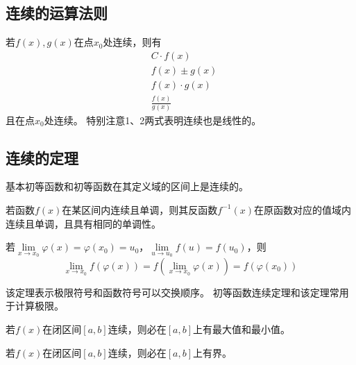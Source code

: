 \subsection{连续的运算法则}

若$f\left( x \right) ,g\left( x \right) $在点$x_0$处连续，则有
\begin{align*}
&C\cdot f\left( x \right) \\
&f\left( x \right) \pm g\left( x \right) \\
&f\left( x \right) \cdot g\left( x \right) \\
&\frac{f\left( x \right)}{g\left( x \right)}
\end{align*}
且在点$x_0$处连续。
特别注意1、2两式表明连续也是线性的。

\subsection{连续的定理}

\begin{theorem}[初等函数连续定理]
基本初等函数和初等函数在其定义域的区间上是连续的。
\end{theorem}

\begin{theorem}[反函数的连续性]
若函数$f\left( x \right) $在某区间内连续且单调，则其反函数$f^{-1}\left( x \right) $在原函数对应的值域内连续且单调，且具有相同的单调性。
\end{theorem}

\begin{theorem}[复合函数的连续性]
若$\underset{x\rightarrow x_0}{\lim}\varphi \left( x \right) =\varphi \left( x_0 \right) =u_0$，$\underset{u\rightarrow u_0}{\lim}f\left( u \right) =f\left( u_0 \right) $，则
\[
\underset{x\rightarrow x_0}{\lim}f\left( \varphi \left( x \right) \right) =f\left( \underset{x\rightarrow x_0}{\lim}\varphi \left( x \right) \right) =f\left( \varphi \left( x_0 \right) \right)
\]
\end{theorem}

该定理表示极限符号和函数符号可以交换顺序。
初等函数连续定理和该定理常用于计算极限。

\begin{theorem}[最值定理]
若$f\left( x \right) $在闭区间$\left[ a,b \right] $连续，则必在$\left[ a,b \right] $上有最大值和最小值。
\end{theorem}

\begin{theorem}[有界定理]
若$f\left( x \right) $在闭区间$\left[ a,b \right] $连续，则必在$\left[ a,b \right] $上有界。
\end{theorem}

